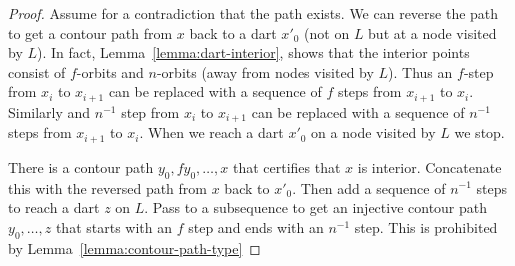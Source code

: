 \begin{proof} Assume for a contradiction that the path exists. 
We can reverse the path to get a contour path from $x$ back to a dart $x'_0$ (not on $L$ but at a node
visited by $L$).  In fact, Lemma~\ref{lemma:dart-interior}, shows that the interior points consist of $f$-orbits
and $n$-orbits (away from nodes visited by $L$).  Thus an $f$-step from $x_i$ to $x_{i+1}$ can be replaced
with a sequence of $f$ steps from $x_{i+1}$ to $x_i$.  Similarly and $n^{-1}$ step from $x_i$ to $x_{i+1}$
can be replaced with a sequence of $n^{-1}$ steps from $x_{i+1}$ to $x_i$.  When we reach a dart $x'_0$ on a node
visited by $L$ we stop.  

There is a contour path $y_0,f y_0,\ldots,x$ that certifies that $x$ is interior.  Concatenate this
with the reversed path from $x$ back to $x'_0$.  Then add a sequence of $n^{-1}$ steps to reach a dart $z$
on $L$.  Pass to a subsequence to get an injective contour path $y_0,\ldots,z$ that starts with an $f$ step
and ends with an $n^{-1}$ step.  This is prohibited by Lemma~\ref{lemma:contour-path-type} 
\end{proof}


